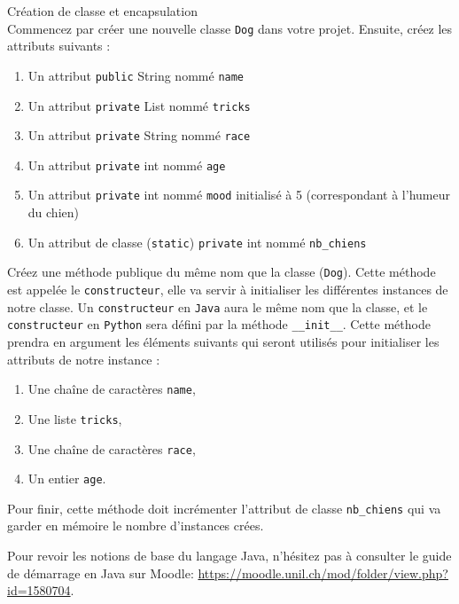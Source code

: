 \begin{Exercice}[10 minutes] Création de classe et encapsulation\\
    Commencez par créer une nouvelle classe \lstinline{Dog} dans votre projet. Ensuite, créez les attributs suivants :
    \begin{enumerate}
    \item Un attribut \lstinline{public} String nommé \lstinline{name}
    \item Un attribut \lstinline{private} List nommé \lstinline{tricks}
    \item Un attribut \lstinline{private} String nommé \lstinline{race}
    \item Un attribut \lstinline{private} int nommé \lstinline{age}
    \item Un attribut \lstinline{private} int nommé \lstinline{mood} initialisé à 5 (correspondant à l'humeur du chien)
    \item Un attribut de classe (\lstinline{static}) \lstinline{private} int nommé \lstinline{nb_chiens}
   	\end{enumerate}
   	
   	Créez une méthode publique du même nom que la classe (\lstinline{Dog}). Cette méthode est appelée le \lstinline{constructeur}, elle va servir à initialiser les différentes instances de notre classe. Un \lstinline{constructeur} en \lstinline{Java} aura le même nom que la classe, et le \lstinline{constructeur} en \lstinline{Python} sera défini par la méthode \lstinline{__init__}. Cette méthode prendra en argument les éléments suivants qui seront utilisés pour initialiser les attributs de notre instance :
   	\begin{enumerate}
    \item Une chaîne de caractères \lstinline{name},
    \item Une liste \lstinline{tricks},
    \item Une chaîne de caractères \lstinline{race},
    \item Un entier \lstinline{age}.
   	\end{enumerate}
   	
   	Pour finir, cette méthode doit incrémenter l'attribut de classe \lstinline{nb_chiens} qui va garder en mémoire le nombre d'instances crées.
   	
\begin{conseil}
    Pour revoir les notions de base du langage Java, n'hésitez pas à consulter le guide de démarrage en Java sur Moodle:
	\url{https://moodle.unil.ch/mod/folder/view.php?id=1580704}.


\end{conseil}
\end{Exercice}

